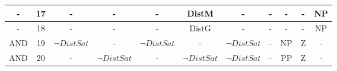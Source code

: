 \begin{table}[ht]
{\begin{tabular}{|c|c|c|c|c|c|c|c|c|c|c|}
-                                                                               & 17                & -              & -              & -              & DistM          & -              & -      & -      & -          & NP         \\ \hline
-                                                                               & 18                & -              & -              & -              & DistG          & -              & -      & -      & -          & NP         \\ \hline
AND                                                                             & 19                & $\neg DistSat$ & -              & $\neg DistSat$ & -              & $\neg DistSat$ & -      & NP     & Z          & -          \\ \hline
AND                                                                             & 20                & -              & $\neg DistSat$ & -              & $\neg DistSat$ & $\neg DistSat$ & -      & PP     & Z          & -          \\ \hline
\end{tabular}
}
\label{tab:regrasSeguirParede}
\end{table}